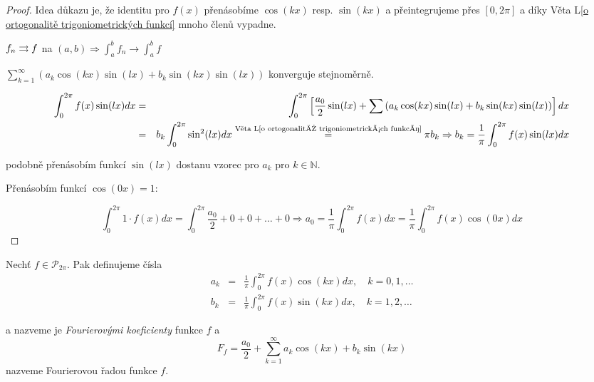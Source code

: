 \begin{proof}
Idea důkazu je, že identitu pro $f(x)$ přenásobíme $\cos(kx)$ resp. $\sin(kx)$  a přeintegrujeme přes $[0, 2 \pi]$ a díky Věta L\ref{o ortogonalitě trigoniometrických funkcí} mnoho členů vypadne.

\begin{opakovani}
$f_n \rightrightarrows f$ na $(a,b) \Rightarrow \int_a^b f_n \rightarrow \int_a^b f$
\end{opakovani}

\begin{pozorovani}
$\sum_{k=1}^{\infty} \left( a_k \cos(kx) \sin(lx) + b_k \sin(kx) \sin(lx) \right)$ konverguje stejnoměrně.
\end{pozorovani}

\begin{eqnarray*}
\int_{0}^{2 \pi} f(x) \sin(lx) dx & = & \int_{0}^{2 \pi} \left[ \frac{a_0}{2} \sin(lx) + \sum \left( a_k \cos(kx) \sin(lx) + b_k \sin(kx) \sin(lx) \right) \right] dx \\
& = & b_k \int_{0}^{2 \pi} \sin^2(lx) dx \overset{\textrm{Věta L\ref{o ortogonalitě trigoniometrických funkcí}}}{=} \pi b_k \Rightarrow b_k = \frac{1}{\pi} \int_0^{2 \pi} f(x) \sin(lx) dx
\end{eqnarray*}

podobně přenásobím funkcí $\sin(lx)$ dostanu vzorec pro $a_k$ pro $k \in \mathbb{N}$.

Přenásobím funkcí $\cos(0x) = 1$:

$$\int_{0}^{2 \pi} 1 \cdot f(x) dx = \int_{0}^{2 \pi} \frac{a_0}{2}+0+0+\ldots+0 \Rightarrow a_0 = \frac{1}{\pi} \int_{0}^{2 \pi} f(x) dx = \frac{1}{\pi} \int_0^{2 \pi} f(x) \cos(0x) dx$$

\end{proof}

\begin{definice}
Nechť $f \in \mathcal{P}_{2 \pi}$. Pak definujeme čísla
\begin{eqnarray*}
a_k & = & \frac{1}{\pi} \int_{0}^{2 \pi} f(x) \cos(kx) dx, \quad k=0,1,\ldots \\
b_k & = & \frac{1}{\pi} \int_{0}^{2 \pi} f(x) \sin(kx) dx, \quad k=1,2,\ldots 
\end{eqnarray*}

a nazveme je \emph{Fourierovými koeficienty} funkce $f$ a 
$$F_f = \frac{a_0}{2} + \sum_{k=1}^\infty a_k \cos(kx) + b_k \sin(kx)$$
nazveme Fourierovou řadou funkce $f$.
\end{definice}

